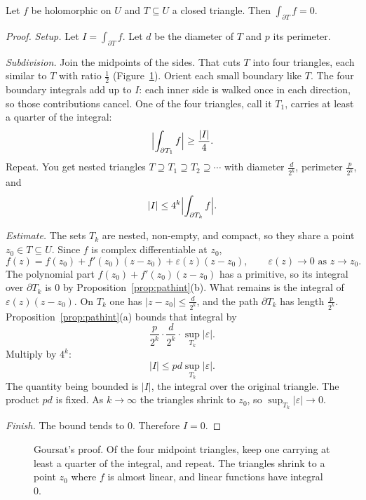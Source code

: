 \begin{theorem}[Goursat]\label{thm:goursat}
Let $f$ be holomorphic on $U$ and $T\subseteq U$ a closed triangle. Then $\int_{\partial T}f=0$.
\end{theorem}
\begin{proof}
\textit{Setup.} Let $I=\int_{\partial T}f$. Let $d$ be the diameter of $T$ and $p$ its perimeter.

\textit{Subdivision.} Join the midpoints of the sides. That cuts $T$ into four triangles, each similar to $T$ with ratio $\frac12$ (Figure~\ref{fig:goursat}). Orient each small boundary like $T$. The four boundary integrals add up to $I$: each inner side is walked once in each direction, so those contributions cancel. One of the four triangles, call it $T_1$, carries at least a quarter of the integral:
\[
\Bigl|\int_{\partial T_1}f\Bigr|\ge\frac{|I|}4.
\]
Repeat. You get nested triangles $T\supseteq T_1\supseteq T_2\supseteq\cdots$ with diameter $\frac d{2^k}$, perimeter $\frac p{2^k}$, and
\[
|I|\le 4^k\Bigl|\int_{\partial T_k}f\Bigr|.
\]

\textit{Estimate.} The sets $T_k$ are nested, non-empty, and compact, so they share a point $z_0\in T\subseteq U$. Since $f$ is complex differentiable at $z_0$,
\[
f(z)=f(z_0)+f'(z_0)(z-z_0)+\varepsilon(z)(z-z_0),\qquad \varepsilon(z)\to0\text{ as }z\to z_0.
\]
The polynomial part $f(z_0)+f'(z_0)(z-z_0)$ has a primitive, so its integral over $\partial T_k$ is $0$ by Proposition~\ref{prop:pathint}(b). What remains is the integral of $\varepsilon(z)(z-z_0)$. On $T_k$ one has $|z-z_0|\le\frac d{2^k}$, and the path $\partial T_k$ has length $\frac p{2^k}$. Proposition~\ref{prop:pathint}(a) bounds that integral by
\[
\frac p{2^k}\cdot\frac d{2^k}\cdot\sup_{T_k}|\varepsilon|.
\]
Multiply by $4^k$:
\[
|I|\le pd\sup_{T_k}|\varepsilon|.
\]
The quantity being bounded is $|I|$, the integral over the original triangle. The product $pd$ is fixed. As $k\to\infty$ the triangles shrink to $z_0$, so $\sup_{T_k}|\varepsilon|\to0$.

\textit{Finish.} The bound tends to $0$. Therefore $I=0$.
\end{proof}

\begin{figure}[ht]
\centering
{}
\caption{Goursat's proof. Of the four midpoint triangles, keep one carrying at least a quarter of the integral, and repeat. The
triangles shrink to a point $z_0$ where $f$ is almost linear, and linear functions have integral $0$.}
\label{fig:goursat}
\end{figure}


